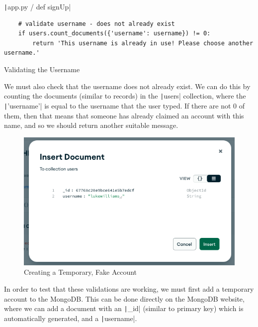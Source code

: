 \documentclass[12pt]{report}
\newcommand{\pil}[1]{\protect\texttt|#1|}
\begin{document}
\begin{listing}[H]
\pil{app.py / def signUp}
\begin{verbatim}
    # validate username - does not already exist
    if users.count_documents({'username': username}) != 0:
        return 'This username is already in use! Please choose another username.'
\end{verbatim}
\caption{Validating the Username}\label{cs:validateUsername}
\end{listing}

We must also check that the username does not already exist. We can do this by counting the documents (similar to records) in the \pil{users} collection, where the \pil{'username'} is equal to the username that the user typed. If there are not 0 of them, then that means that someone has already claimed an account with this name, and so we should return another suitable message. 

\begin{figure}[H]
\centering
\includegraphics[width=12cm]{ss15.6.png}
\caption{Creating a Temporary, Fake Account}\label{fig:ss15.6}
\end{figure}

In order to test that these validations are working, we must first add a temporary account to the MongoDB. This can be done directly on the MongoDB website, where we can add a document with an \pil{_id} (similar to primary key) which is automatically generated, and a \pil{username}.
\end{document}
